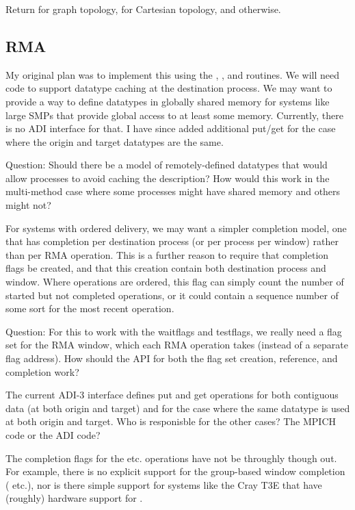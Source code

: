 \documentclass{article}
\begin{document}
\subsubsection{}
Return  for graph topology,  for
Cartesian topology, and  otherwise.

\subsection{RMA}

My original plan was to implement this using the ,
,  and  routines.  We
will need code to support datatype caching at the destination process.
We may want to provide a way to define datatypes in globally shared
memory for systems like large SMPs that provide global access to at
least some memory.  Currently, there is no ADI interface for that.
I have since added additional put/get for the case where the origin
and target datatypes are the same.  

Question:  Should there be a model of remotely-defined datatypes that
would allow processes to avoid caching the description?  How would
this work in the multi-method case where some processes might have
shared memory and others might not?

For systems with ordered delivery, we may want a simpler completion
model, one that has completion per destination process (or per process
per window) rather than per RMA operation.  This is a further reason
to require that completion flags be created, and that this creation
contain both destination process and window.  Where operations are
ordered, this flag can simply count the number of started but not
completed operations, or it could contain a sequence number of some
sort for the most recent operation.  

Question:  For this to work with the waitflags and testflags, we
really need a flag set for the RMA window, which each RMA operation
takes (instead of a separate flag address).  How should the API for
both the flag set creation, reference, and completion work?  

The current ADI-3 interface defines put and get operations for both
contiguous data (at both origin and target) and for the case where the
same datatype is used at both origin and target.  Who is responisble
for the other cases?  The MPICH code or the ADI code?

The completion flags for the  etc. operations
have not be throughly though out.  For example, there is no explicit
support for the group-based window completion (
etc.), nor is there simple support for systems like the Cray T3E that
have (roughly) hardware support for .
\end{document}

